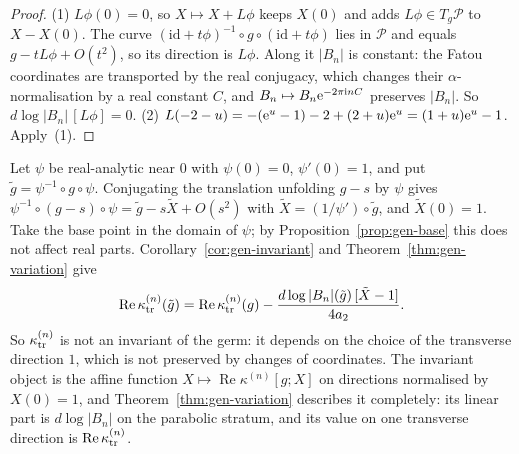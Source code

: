 \begin{proof}
(1) $L\phi(0)=0$, so $X\mapsto X+L\phi$ keeps $X(0)$ and adds $L\phi\in T_g\mathcal P$
to $X-X(0)$.  The curve $(\mathrm{id}+t\phi)^{-1}\circ g\circ(\mathrm{id}+t\phi)$
lies in $\mathcal P$ and equals $g-tL\phi+O(t^2)$, so its direction is $L\phi$.
Along it $|B_n|$ is constant: the Fatou coordinates are transported by the
real conjugacy, which changes their $\alpha$-normalisation by a real
constant $C$, and $B_n\mapsto B_n\mathrm{e}^{-2\pi\mathrm{i} nC}$ preserves $|B_n|$.  So
$d\log|B_n|\,[L\phi]=0$.
(2) $L(-2-u)=-(\mathrm{e}^u-1)-2+(2+u)\mathrm{e}^u=(1+u)\mathrm{e}^u-1$.  Apply~(1).
\end{proof}

\begin{remark}\label{rem:gen-cocycle}
Let $\psi$ be real-analytic near $0$ with $\psi(0)=0$, $\psi'(0)=1$, and put
$\tilde g=\psi^{-1}\circ g\circ\psi$.  Conjugating the translation unfolding
$g-s$ by $\psi$ gives $\psi^{-1}\circ(g-s)\circ\psi=\tilde g-s\tilde X+O(s^2)$
with $\tilde X=(1/\psi')\circ\tilde g$, and $\tilde X(0)=1$.  Take the base point
in the domain of $\psi$; by Proposition~\ref{prop:gen-base} this does not affect
real parts.  Corollary~\ref{cor:gen-invariant}
and Theorem~\ref{thm:gen-variation} give
\[
 \operatorname{Re}\kappa^{(n)}_{\rm tr}(\tilde g)=\operatorname{Re}\kappa^{(n)}_{\rm tr}(g)
 -\frac{d\log|B_n|(\tilde g)\,[\tilde X-1]}{4a_2} .
\]
So $\kappa^{(n)}_{\rm tr}$ is not an invariant of the germ: it depends on the
choice of the transverse direction $1$, which is not preserved by changes of
coordinates.  The invariant object is the affine function
$X\mapsto\operatorname{Re}\kappa^{(n)}[g;X]$ on directions normalised by $X(0)=1$, and
Theorem~\ref{thm:gen-variation} describes it completely: its linear part is
$d\log|B_n|$ on the parabolic stratum, and its value on one transverse
direction is $\operatorname{Re}\kappa^{(n)}_{\rm tr}$.
\end{remark}

